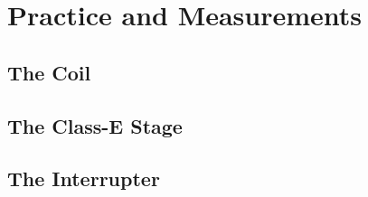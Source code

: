 \chapter{Practice and Measurements} %

\section{The Coil}

\section{The Class-E Stage}

\section{The Interrupter}